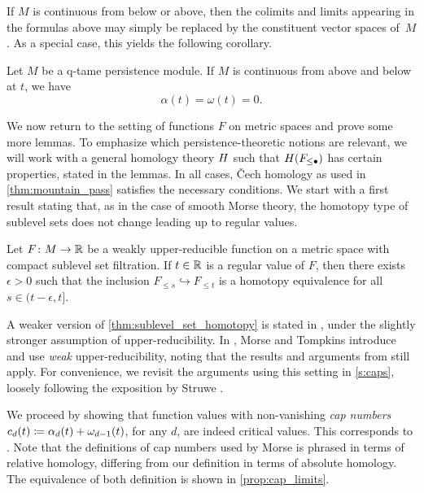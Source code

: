 If $M$ is continuous from below or above, then the colimits and limits appearing in the formulas above may simply be replaced by the constituent vector spaces of~$M$.
As a special case, this yields the following corollary.

\begin{cor}
\label{cor:regular_value_no_endpoint}
	Let $M$ be a q-tame persistence module.
	If $M$ is continuous from above and below at $t$, we have
	\[
		\alpha(t) = \omega(t) = 0.
	\]
\end{cor}

We now return to the setting of functions $F$ on metric spaces and prove some more lemmas.
To emphasize which persistence-theoretic notions are relevant, we will work with a general homology theory $H$ such that $H(F_{\leq \bullet})$ has certain properties, stated in the lemmas.
In all cases, \v{C}ech homology as used in \cref{thm:mountain_pass} satisfies the necessary conditions.
We start with a first result stating that, as in the case of smooth Morse theory, the homotopy type of sublevel sets does not change leading up to regular values.

\begin{thm}\label{thm:sublevel_set_homotopy}
	Let $F \colon M \to \mathbb{R}$ be a weakly upper-reducible function on a metric space with compact sublevel set filtration.
	If $t \in \mathbb{R}$ is a regular value of $F$, then there exists $\epsilon > 0$ such that the inclusion $F_{\leq s} \hookrightarrow F_{\leq t}$ is a homotopy equivalence for all $s \in (t - \epsilon, t]$.
\end{thm}

A weaker version of \cref{thm:sublevel_set_homotopy} is stated in \cite[Lemma 8.1]{Morse.1938}, under the slightly stronger assumption of upper-reducibility.
In \cite{Morse.1939}, Morse and Tompkins introduce and use \emph{weak} upper-reducibility, noting that the results and arguments from \cite[Sections 7 and 8]{Morse.1938} still apply.
For convenience, we revisit the arguments using this setting in \cref{s:caps}, loosely following the exposition by Struwe \cite[Remark II.6.3]{Struwe.1988}.

We proceed by showing that function values with non-vanishing \emph{cap numbers} $c_d(t) \coloneqq \alpha_d(t) + \omega_{d-1}(t)$, for any $d$, are indeed critical values.
This corresponds to \cite[Theorem 8.1]{Morse.1938}.
Note that the definitions of cap numbers used by Morse is phrased in terms of relative homology, differing from our definition in terms of absolute homology. The equivalence of both definition is shown in \cref{prop:cap_limits}.

